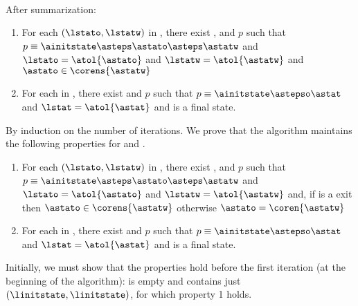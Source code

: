 \documentclass{LMCS}
\theoremstyle{definition} \newtheorem{property}[thm]{Property}
\begin{document}
$\phantom{i}$\newline
\begin{thm}[Completeness] ~\\
  After summarization:
  \begin{enumerate}[$\bullet$]
  \item
    For each $(\lstato, \lstatw)$ in \seen,
    there exist \astato, \astatw{} and $p$ such that 
    $p \equiv \ainitstate \asteps \astato \asteps \astatw$ and
    $\lstato = \atol{\astato}$ and
    $\lstatw = \atol{\astatw}$ and
    $\astato \in \corens{\astatw}$
  \item
    For each \lstat{} in \finals, 
    there exist \astat{} and $p$ such that 
    $p \equiv \ainitstate \astepso \astat$ and $\lstat = \atol{\astat}$ and
    \astat{} is a final state.
  \end{enumerate}
\end{thm}
\proof By induction on the number of iterations. 
We prove that the algorithm maintains the following properties for
\seen{} and \finals{}.
\begin{enumerate}
\item \label{thm:sum/tion-complete,prop-non-final}
  For each $(\lstato, \lstatw)$ in \seen, 
  there exist \astato, \astatw{} and $p$ such that 
  $p \equiv \ainitstate \asteps \astato \asteps \astatw$ and
  $\lstato = \atol{\astato}$ and $\lstatw = \atol{\astatw}$ and,
  if \lstatw{} is a \dlceval{} exit then $\astato \in \corens{\astatw}$
  otherwise $\astato = \coren{\astatw}$
\item \label{thm:sum/tion-complete,prop-final}
  For each \lstat{} in \finals, there exist \astat{} and $p$ such that
  $p \equiv \ainitstate \astepso \astat$ and $\lstat = \atol{\astat}$ and
  \astat{} is a final state.
\end{enumerate}
Initially, we must show that the properties hold before the first iteration 
(at the beginning of the algorithm):
\finals{} is empty and \work{} contains just $(\linitstate, \linitstate)$,
for which property 1 holds.
\end{document}
